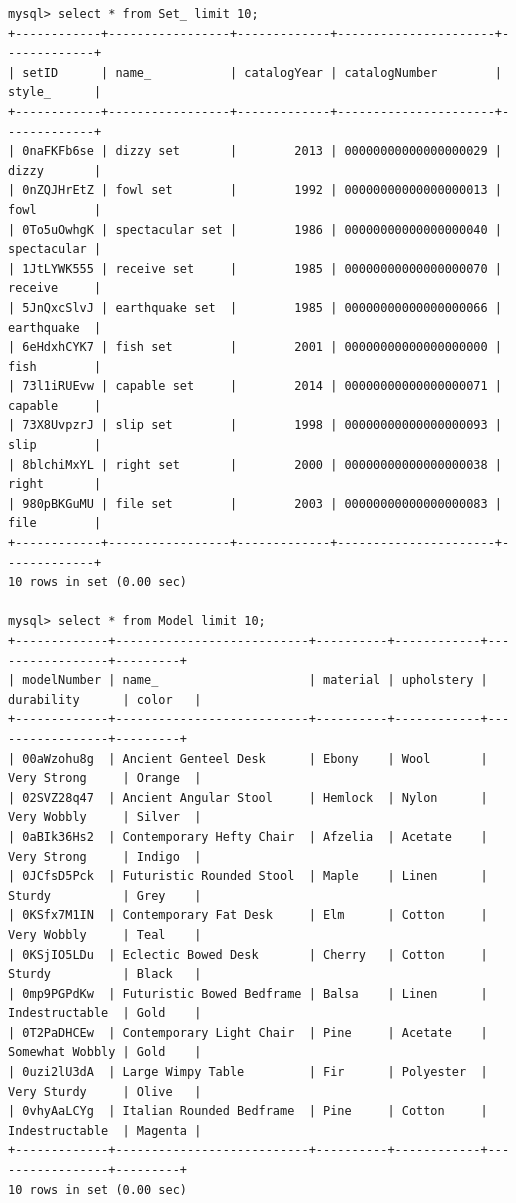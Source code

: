 \documentclass[american,extrafontsizes,12pt,portrait,letterpaper,oneside,onecolumn,final]{memoir}
\begin{document}
\begin{verbatim}
mysql> select * from Set_ limit 10;
+------------+-----------------+-------------+----------------------+-------------+
| setID      | name_           | catalogYear | catalogNumber        | style_      |
+------------+-----------------+-------------+----------------------+-------------+
| 0naFKFb6se | dizzy set       |        2013 | 00000000000000000029 | dizzy       |
| 0nZQJHrEtZ | fowl set        |        1992 | 00000000000000000013 | fowl        |
| 0To5uOwhgK | spectacular set |        1986 | 00000000000000000040 | spectacular |
| 1JtLYWK555 | receive set     |        1985 | 00000000000000000070 | receive     |
| 5JnQxcSlvJ | earthquake set  |        1985 | 00000000000000000066 | earthquake  |
| 6eHdxhCYK7 | fish set        |        2001 | 00000000000000000000 | fish        |
| 73l1iRUEvw | capable set     |        2014 | 00000000000000000071 | capable     |
| 73X8UvpzrJ | slip set        |        1998 | 00000000000000000093 | slip        |
| 8blchiMxYL | right set       |        2000 | 00000000000000000038 | right       |
| 980pBKGuMU | file set        |        2003 | 00000000000000000083 | file        |
+------------+-----------------+-------------+----------------------+-------------+
10 rows in set (0.00 sec)

mysql> select * from Model limit 10;
+-------------+---------------------------+----------+------------+-----------------+---------+
| modelNumber | name_                     | material | upholstery | durability      | color   |
+-------------+---------------------------+----------+------------+-----------------+---------+
| 00aWzohu8g  | Ancient Genteel Desk      | Ebony    | Wool       | Very Strong     | Orange  |
| 02SVZ28q47  | Ancient Angular Stool     | Hemlock  | Nylon      | Very Wobbly     | Silver  |
| 0aBIk36Hs2  | Contemporary Hefty Chair  | Afzelia  | Acetate    | Very Strong     | Indigo  |
| 0JCfsD5Pck  | Futuristic Rounded Stool  | Maple    | Linen      | Sturdy          | Grey    |
| 0KSfx7M1IN  | Contemporary Fat Desk     | Elm      | Cotton     | Very Wobbly     | Teal    |
| 0KSjIO5LDu  | Eclectic Bowed Desk       | Cherry   | Cotton     | Sturdy          | Black   |
| 0mp9PGPdKw  | Futuristic Bowed Bedframe | Balsa    | Linen      | Indestructable  | Gold    |
| 0T2PaDHCEw  | Contemporary Light Chair  | Pine     | Acetate    | Somewhat Wobbly | Gold    |
| 0uzi2lU3dA  | Large Wimpy Table         | Fir      | Polyester  | Very Sturdy     | Olive   |
| 0vhyAaLCYg  | Italian Rounded Bedframe  | Pine     | Cotton     | Indestructable  | Magenta |
+-------------+---------------------------+----------+------------+-----------------+---------+
10 rows in set (0.00 sec)


\end{verbatim}
\end{document}

